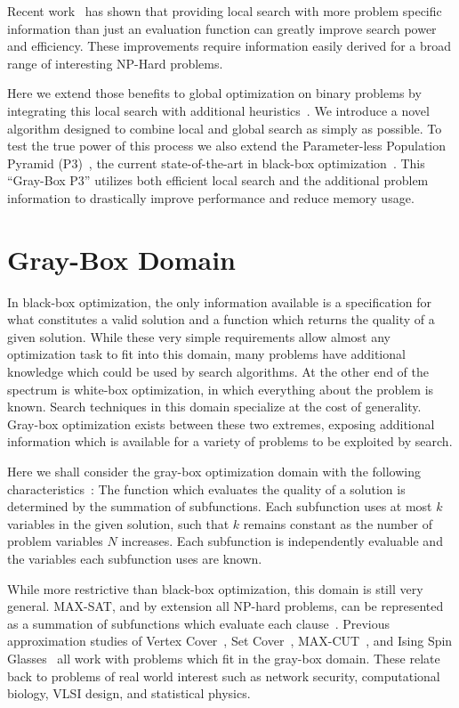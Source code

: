 \documentclass{sig-alternate}
\begin{document}
Recent work~\cite{whitley:2013:greedy,chicano:2014:ball} has shown that
providing local search with more problem specific information than just an evaluation function can
greatly improve search power and efficiency. These improvements
require information easily derived for a broad range of interesting NP-Hard
problems.

Here we extend those benefits to global optimization on binary problems by integrating
this local search with additional heuristics~\cite{chen:2011:memetic}.
We introduce a novel algorithm designed to combine local
and global search as simply as possible. To test the true power of this
process we also extend the Parameter-less Population Pyramid (P3)~\cite{goldman:2014:p3}, the
current state-of-the-art in black-box optimization~\cite{goldman:2015:fastp3}. This ``Gray-Box P3''
utilizes both efficient local search and the additional problem information
to drastically improve performance and reduce memory usage.

\section{Gray-Box Domain}
\label{sec-gray-box}
In black-box optimization, the only information available is a specification
for what constitutes a valid solution and a function which returns the quality
of a given solution. While these very simple requirements allow almost any
optimization task to fit into this domain, many problems have additional knowledge
which could be used by search algorithms. At the other end of
the spectrum is white-box optimization, in which everything about the problem
is known. Search techniques in this domain specialize at the cost of generality.
Gray-box optimization exists between these two extremes, exposing additional
information which is available for a variety of problems to be exploited by search.

Here we shall consider the gray-box optimization domain with the following
characteristics~\cite{chicano:2014:ball}: The function which evaluates the quality of a solution is determined by the summation
of subfunctions. Each subfunction uses at most $k$ variables in the given solution,
such that $k$ remains constant as the number of problem variables $N$ increases.
Each subfunction is independently evaluable and the variables each subfunction uses are known.

While more restrictive than black-box optimization, this domain is still very general.
MAX-SAT, and by extension all NP-hard problems, can be represented
as a summation of subfunctions which evaluate each clause~\cite{whitley:2013:greedy}.
Previous approximation studies of Vertex Cover~\cite{oliveto:2009:vertexcover},
Set Cover~\cite{yu:2010:setcover}, MAX-CUT~\cite{festa:2002:maxcut}, and
Ising Spin Glasses~\cite{pelikan:2003:hboaising} all work with problems which fit
in the gray-box domain. These relate back to problems of real world interest such
as network security, computational biology, VLSI design, and statistical physics.
\end{document}
